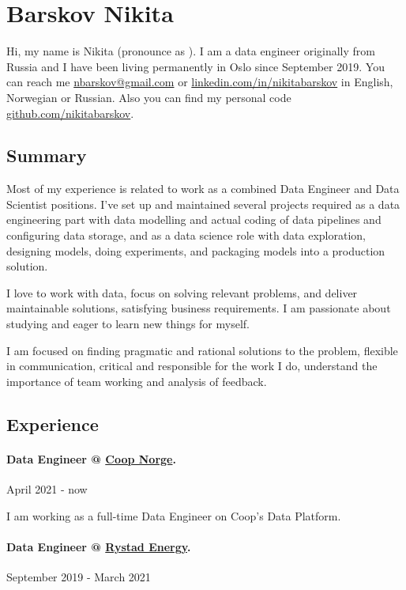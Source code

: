 \documentclass[10pt]{article}
\begin{document}
\section*{Barskov Nikita}

Hi, my name is Nikita (pronounce as ). I am a data engineer originally from Russia and
I have been living permanently in Oslo since September 2019.
You can reach me \faEnvelope \href{mailto:nbarskov@gmail.com}{nbarskov@gmail.com}
or \faLinkedin \href{https://linkedin.com/in/nikitabarskov}{linkedin.com/in/nikitabarskov}
in English, Norwegian or Russian. Also you can find my personal code
\faGithub \href{https://github.com/nikitabarskov}{github.com/nikitabarskov}.

\subsection*{Summary}

Most of my experience is related to work as a combined Data Engineer
and Data Scientist positions. I've set up and maintained several projects
required as a data engineering part with data modelling and actual coding of
data pipelines and configuring data storage, and as a data science
role with data exploration, designing models, doing experiments,
and packaging models into a production solution.

I love to work with data, focus on solving relevant problems,
and deliver maintainable solutions, satisfying business requirements.
I am passionate about studying and eager to learn new things for myself.

I am focused on finding pragmatic and rational solutions to the problem,
flexible in communication, critical and responsible for the work I do,
understand the importance of team working and analysis of feedback.

\subsection*{Experience}

\paragraph*{Data Engineer @ \href{https://coop.no}{Coop Norge}.} April 2021 - now

I am working as a full-time Data Engineer on Coop's Data Platform.

\paragraph*{Data Engineer @ \href{https://www.rystadenergy.com}{Rystad Energy}.} September 2019 - March 2021
\end{document}

